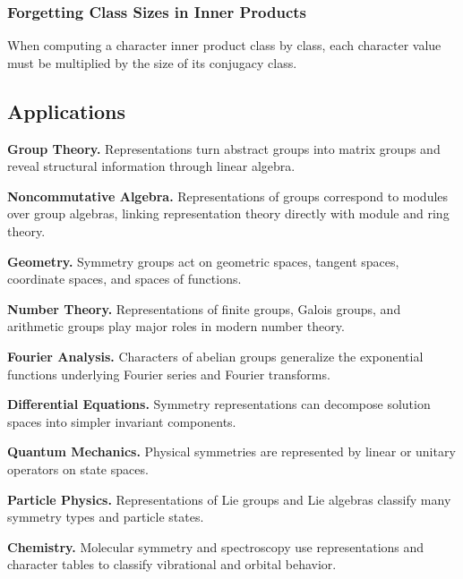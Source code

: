 \subsubsection{Forgetting Class Sizes in Inner Products}

When computing a character inner product class by class, each character
value must be multiplied by the size of its conjugacy class.

\subsection{Applications}
\label{subsec:representation-applications}

\begin{applicationbox}
\textbf{Group Theory.}
Representations turn abstract groups into matrix groups and reveal structural
information through linear algebra.

\medskip

\textbf{Noncommutative Algebra.}
Representations of groups correspond to modules over group algebras, linking
representation theory directly with module and ring theory.

\medskip

\textbf{Geometry.}
Symmetry groups act on geometric spaces, tangent spaces, coordinate spaces,
and spaces of functions.

\medskip

\textbf{Number Theory.}
Representations of finite groups, Galois groups, and arithmetic groups play
major roles in modern number theory.

\medskip

\textbf{Fourier Analysis.}
Characters of abelian groups generalize the exponential functions underlying
Fourier series and Fourier transforms.

\medskip

\textbf{Differential Equations.}
Symmetry representations can decompose solution spaces into simpler
invariant components.

\medskip

\textbf{Quantum Mechanics.}
Physical symmetries are represented by linear or unitary operators on state
spaces.

\medskip

\textbf{Particle Physics.}
Representations of Lie groups and Lie algebras classify many symmetry types
and particle states.

\medskip

\textbf{Chemistry.}
Molecular symmetry and spectroscopy use representations and character tables
to classify vibrational and orbital behavior.
\end{applicationbox}

